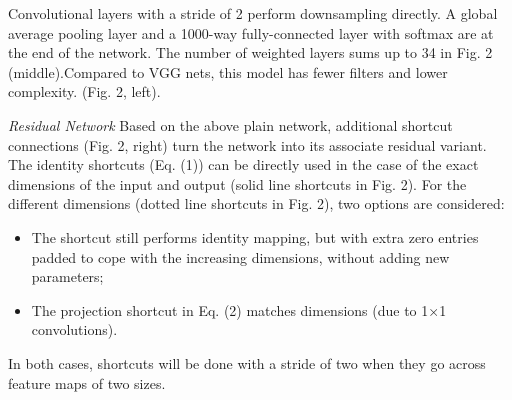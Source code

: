 \documentclass[
]{krantz}
\providecommand{\tightlist}{%
  \setlength{\itemsep}{0pt}\setlength{\parskip}{0pt}}
\begin{document}
Convolutional layers with a stride of 2 perform downsampling directly. A global average pooling layer and a 1000-way fully-connected layer with softmax are at the end of the network. The number of weighted layers sums up to 34 in Fig. 2 (middle).Compared to VGG nets, this model has fewer filters and lower complexity. (Fig. 2, left).

\emph{Residual Network} Based on the above plain network, additional shortcut connections (Fig. 2, right) turn the network into its associate residual variant. The identity shortcuts (Eq. (1)) can be directly used in the case of the exact dimensions of the input and output (solid line shortcuts in Fig. 2). For the different dimensions (dotted line shortcuts in Fig. 2), two options are considered:

\begin{itemize}
\tightlist
\item
  The shortcut still performs identity mapping, but with extra zero entries padded to cope with the increasing dimensions, without adding new parameters;
\item
  The projection shortcut in Eq. (2) matches dimensions (due to 1×1 convolutions).
\end{itemize}

In both cases, shortcuts will be done with a stride of two when they go across feature maps of two sizes.
\end{document}
